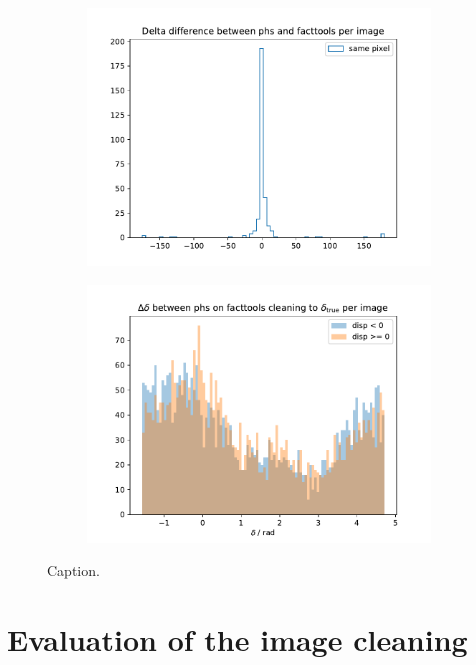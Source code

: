 \begin{figure}
\begin{subfigure}{0.5\textwidth}
  \end{subfigure}
  \begin{subfigure}{0.5\textwidth}
    \includegraphics[width=1.1\textwidth]{Plots/delta_hist_same_cleaning_pe_20131104_162.pdf}
  \end{subfigure}
  \begin{subfigure}{0.5\textwidth}
    \includegraphics[width=1.1\textwidth]{Plots/delta_true_diff_hist_thresholds_rad_20131104_162.pdf}
  \end{subfigure}
  \caption{Caption.}
  \label{fig:delta}
\end{figure}

\section{Evaluation of the image cleaning}
%

